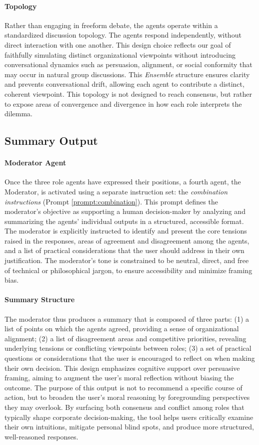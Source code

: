 \paragraph{Topology}{
  Rather than engaging in freeform debate, the agents operate within a standardized discussion topology. The agents respond independently, without direct interaction with one another. This design choice reflects our goal of faithfully simulating distinct organizational viewpoints without introducing conversational dynamics such as persuasion, alignment, or social conformity that may occur in natural group discussions. This \textit{Ensemble} structure ensures clarity and prevents conversational drift, allowing each agent to contribute a distinct, coherent viewpoint. This topology is not designed to reach consensus, but rather to expose areas of convergence and divergence in how each role interprets the dilemma.
}

\subsection{Summary Output}

\paragraph{Moderator Agent}{
  Once the three role agents have expressed their positions, a fourth agent, the Moderator, is activated using a separate instruction set: the \textit{combination instructions} (Prompt \ref{prompt:combination}). This prompt defines the moderator's objective as supporting a human decision-maker by analyzing and summarizing the agents' individual outputs in a structured, accessible format. The moderator is explicitly instructed to identify and present the core tensions raised in the responses, areas of agreement and disagreement among the agents, and a list of practical considerations that the user should address in their own justification. The moderator's tone is constrained to be neutral, direct, and free of technical or philosophical jargon, to ensure accessibility and minimize framing bias.
}

\paragraph{Summary Structure}
The moderator thus produces a summary that is composed of three parts: (1) a list of points on which the agents agreed, providing a sense of organizational alignment; (2) a list of disagreement areas and competitive priorities, revealing underlying tensions or conflicting viewpoints between roles; (3) a set of practical questions or considerations that the user is encouraged to reflect on when making their own decision.
This design emphasizes cognitive support over persuasive framing, aiming to augment the user's moral reflection without biasing the outcome.
The purpose of this output is not to recommend a specific course of action, but to broaden the user's moral reasoning by foregrounding perspectives they may overlook. By surfacing both consensus and conflict among roles that typically shape corporate decision-making, the tool helps users critically examine their own intuitions, mitigate personal blind spots, and produce more structured, well-reasoned responses.
